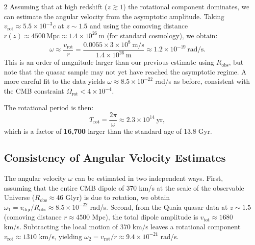 \documentclass[12pt,a4paper]{article}
\newcommand{\Omegarot}{\Omega_{\mathrm{rot}}}
\begin{document}
\begin{multicols}{2}
		Assuming that at high redshift (\(z\gtrsim1\)) the rotational component dominates, we can estimate the angular velocity from the asymptotic amplitude. Taking \(v_{\text{rot}} \approx 5.5\times10^{-3}c\) at \(z\sim1.5\) and using the comoving distance \(r(z) \approx 4500\ \text{Mpc} \approx 1.4\times10^{26}\ \text{m}\) (for standard cosmology), we obtain:
		\begin{equation}
			\omega \approx \frac{v_{\text{rot}}}{r} = \frac{0.0055 \times 3\times10^8\ \text{m/s}}{1.4\times10^{26}\ \text{m}} \approx 1.2\times10^{-19}\ \text{rad/s}.
		\end{equation}
		This is an order of magnitude larger than our previous estimate using \(R_{\text{obs}}\), but note that the quasar sample may not yet have reached the asymptotic regime. A more careful fit to the data yields \(\omega \approx 8.5\times10^{-22}\) rad/s as before, consistent with the CMB constraint \(\Omegarot < 4\times10^{-4}\).
		
		The rotational period is then:
		\begin{equation}
			T_{\text{rot}} = \frac{2\pi}{\omega} \approx 2.3 \times 10^{14}\ \text{yr},
		\end{equation}
		which is a factor of \textbf{16,700} larger than the standard age of 13.8 Gyr.
		
		\subsection{Consistency of Angular Velocity Estimates}
		
		The angular velocity \(\omega\) can be estimated in two independent ways. First, assuming that the entire CMB dipole of 370 km/s at the scale of the observable Universe (\(R_{\text{obs}} \approx 46\) Glyr) is due to rotation, we obtain \(\omega_1 = v_{\text{dip}}/R_{\text{obs}} \approx 8.5\times10^{-22}\) rad/s. Second, from the Quaia quasar data at \(z\sim1.5\) (comoving distance \(r \approx 4500\) Mpc), the total dipole amplitude is \(v_{\text{tot}} \approx 1680\) km/s. Subtracting the local motion of 370 km/s leaves a rotational component \(v_{\text{rot}} \approx 1310\) km/s, yielding \(\omega_2 = v_{\text{rot}}/r \approx 9.4\times10^{-21}\) rad/s.
		

\end{multicols}
\end{document}
